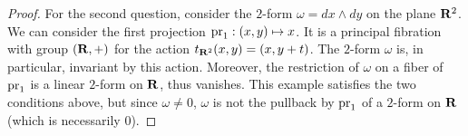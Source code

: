 \begin{proof}
  For the second question, consider the $2$-form $\omega = dx \wedge dy$ on the plane $\mathbf{R}^2$.
  We can consider the first projection $\operatorname{pr}_1 : (x,y) \mapsto x$.
  It is a
  principal fibration with group $(\mathbf{R},+)$ for the action
  $t_{\mathbf{R}^2}(x,y) = (x, y+t)$.
   The $2$-form $\omega$ is,
  in particular,
  invariant by this action.
  Moreover,
  the restriction of $\omega$ on a fiber of $\operatorname{pr}_1$ is a linear $2$-form
  on $\mathbf{R}$,
  thus vanishes.
  This example satisfies the two conditions above,
  but since $\omega \neq 0$, $\omega$ is not the pullback by $\operatorname{pr}_1$ of a $2$-form on $\mathbf{R}$
  (which is necessarily $0$).
\end{proof}
